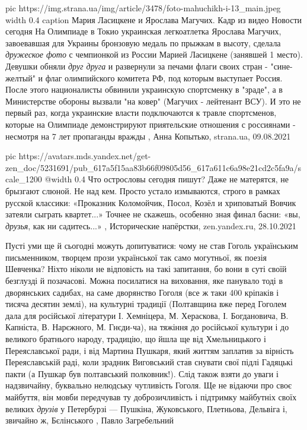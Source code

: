\ifcmt
  pic https://img.strana.ua/img/article/3478/foto-mahuchikh-i-13_main.jpeg
  width 0.4
	caption Мария Ласицкене и Ярослава Магучих. Кадр из видео Новости сегодня 
\fi
На Олимпиаде в Токио украинская легкоатлетка Ярослава Магучих, завоевавшая для
Украины бронзовую медаль по прыжкам в высоту, сделала \emph{дружеское фото} с
чемпионкой из России Марией Ласицкене (занявшей 1 место).
Девушки обняли \emph{друг друга} и развернули за печами флаги своих стран -
"сине-желтый" и флаг олимпийского комитета РФ, под которым выступает Россия.
После этого националисты обвинили украинскую спортсменку в "зраде", а в
Министерстве обороны вызвали "на ковер" (Магучих - лейтенант ВСУ). И это не
первый раз, когда украинские власти подключаются к травле спортсменов, которые
на Олимпиаде демонстрируют приятельские отношения с россиянами - несмотря на 7
лет пропаганды вражды
, 
Анна Копытько, strana.ua, 09.08.2021

\ifcmt
  pic https://avatars.mds.yandex.net/get-zen_doc/5231691/pub_617a5f15aa83b66f09805d56_617a611c6a98e21cd2c5fa9a/scale_1200
  @width 0.4
\fi
Что острословы сегодня пишут? Даже не матерятся, не брызгают слюной. Не над
кем. Просто устало измываются, строго в рамках русской классики: «Проказник
Коломойчик, Посол, Козёл и хриповатый Вовчик затеяли сыграть квартет...» Точнее
не скажешь, особенно зная финал басни: «вы, \emph{друзья}, как ни садитесь...»
, 
Исторические напёрстки, zen.yandex.ru, 28.10.2021

Пусті уми ще й сьогодні можуть допитуватися: чому не став Гоголь українським
письменником, творцем прози української так само могутньої, як поезія Шевченка?
Ніхто ніколи не відповість на такі запитання, бо вони в суті своїй безглузді й
позачасові. Можна посилатися на виховання, яке панувало тоді в дворянських
садибах, на саме дворянство Гоголя (все ж таки 400 кріпаків і тисяча десятин
землі), на культурні традиції (Полтавщина вже перед Гоголем дала для російської
літератури І. Хемніцера, М. Хераскова, І. Богдановича, В. Капніста, В.
Нарєжного, М. Гнєди-ча), на тяжіння до російської культури і до великого
братнього народу, традицію, що йшла ще від Хмельницького і Переяславської ради,
і від Мартина Пушкаря, який життям заплатив за вірність Переяславській раді,
коли зрадник Виговський став снувати свої підлі Гадяцькі пакти (а Пушкар був
полтавський полковник!). Слід також взяти до уваги і надзвичайну, буквально
нелюдську чутливість Гоголя. Ще не відаючи про своє майбуття, він мовби
передчував ту доброзичливість і підтримку майбутніх своїх великих \emph{друзів} у
Петербурзі — Пушкіна, Жуковського, Плетньова, Дельвіга і, звичайно ж,
Бєлінського
, Павло Загребельний

